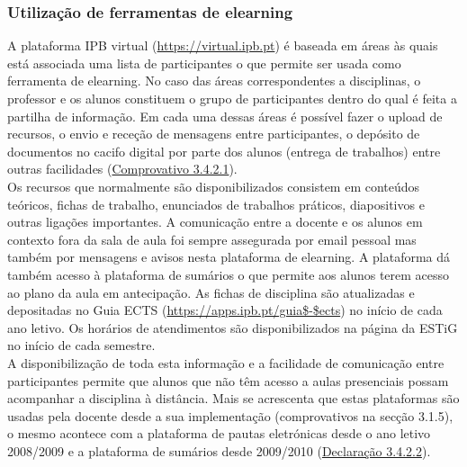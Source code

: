 \documentclass[11pt]{article}
\begin{document}
\subsubsection{Utilização de ferramentas de elearning}
A plataforma IPB virtual (\url{https://virtual.ipb.pt}) é baseada em áreas às quais está associada uma lista de participantes o que permite ser usada como ferramenta de elearning. No caso das áreas correspondentes a disciplinas, o professor e os alunos constituem o grupo de participantes dentro do qual é feita a partilha de informação. Em cada uma dessas áreas é possível fazer o upload de recursos, o envio e receção de mensagens entre participantes, o depósito de documentos no cacifo digital por parte dos alunos (entrega de trabalhos) entre outras facilidades (\href{run:Virtual/mensagensvirtual.pdf}{Comprovativo 3.4.2.1}).\\
Os recursos que normalmente são disponibilizados consistem em conteúdos teóricos, fichas de trabalho, enunciados de trabalhos práticos, diapositivos e outras ligações importantes. 
A comunicação entre a docente e os alunos em contexto fora da sala de aula foi sempre assegurada por email pessoal mas também por mensagens e avisos nesta plataforma de elearning.
A plataforma dá também acesso à plataforma de sumários o que permite aos alunos terem acesso ao plano da aula em antecipação. 
As fichas de disciplina são atualizadas e depositadas no Guia ECTS (\url{https://apps.ipb.pt/guia$-$ects}) no início de cada ano letivo. Os horários de atendimentos são disponibilizados na página da ESTiG no início de cada semestre.\\
A disponibilização de toda esta informação e a facilidade de comunicação entre participantes permite que alunos que não têm acesso a aulas presenciais possam acompanhar a disciplina à distância.
Mais se acrescenta que estas plataformas são usadas pela docente desde a sua implementação (comprovativos na secção 3.1.5), o mesmo acontece com a plataforma de pautas eletrónicas desde o ano letivo 2008/2009 e a plataforma de sumários desde 2009/2010  (\href{run:Virtual/pautassumarios.pdf}{Declaração 3.4.2.2}).
\end{document}
